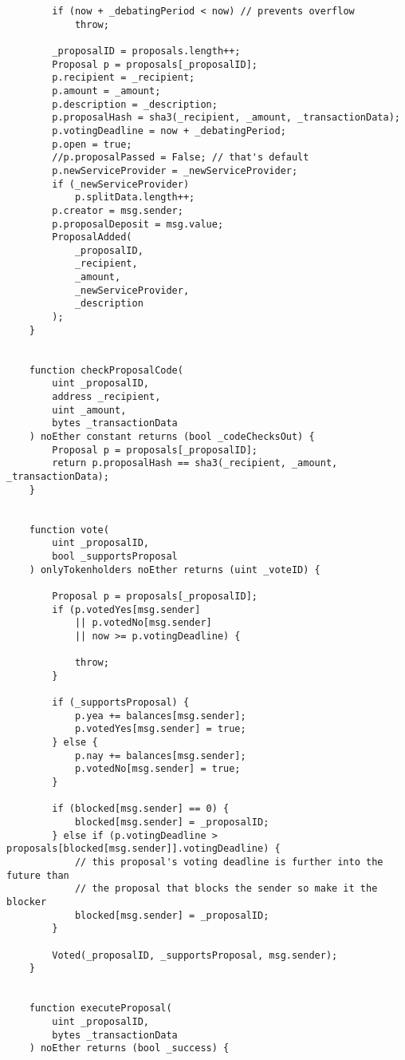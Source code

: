 \documentclass[9pt,oneside]{amsart}
\begin{document}
\begin{appendix}
\begin{verbatim}
        if (now + _debatingPeriod < now) // prevents overflow
            throw;

        _proposalID = proposals.length++;
        Proposal p = proposals[_proposalID];
        p.recipient = _recipient;
        p.amount = _amount;
        p.description = _description;
        p.proposalHash = sha3(_recipient, _amount, _transactionData);
        p.votingDeadline = now + _debatingPeriod;
        p.open = true;
        //p.proposalPassed = False; // that's default
        p.newServiceProvider = _newServiceProvider;
        if (_newServiceProvider)
            p.splitData.length++;
        p.creator = msg.sender;
        p.proposalDeposit = msg.value;
        ProposalAdded(
            _proposalID,
            _recipient,
            _amount,
            _newServiceProvider,
            _description
        );
    }


    function checkProposalCode(
        uint _proposalID,
        address _recipient,
        uint _amount,
        bytes _transactionData
    ) noEther constant returns (bool _codeChecksOut) {
        Proposal p = proposals[_proposalID];
        return p.proposalHash == sha3(_recipient, _amount, _transactionData);
    }


    function vote(
        uint _proposalID,
        bool _supportsProposal
    ) onlyTokenholders noEther returns (uint _voteID) {

        Proposal p = proposals[_proposalID];
        if (p.votedYes[msg.sender]
            || p.votedNo[msg.sender]
            || now >= p.votingDeadline) {

            throw;
        }

        if (_supportsProposal) {
            p.yea += balances[msg.sender];
            p.votedYes[msg.sender] = true;
        } else {
            p.nay += balances[msg.sender];
            p.votedNo[msg.sender] = true;
        }

        if (blocked[msg.sender] == 0) {
            blocked[msg.sender] = _proposalID;
        } else if (p.votingDeadline > proposals[blocked[msg.sender]].votingDeadline) {
            // this proposal's voting deadline is further into the future than
            // the proposal that blocks the sender so make it the blocker
            blocked[msg.sender] = _proposalID;
        }

        Voted(_proposalID, _supportsProposal, msg.sender);
    }


    function executeProposal(
        uint _proposalID,
        bytes _transactionData
    ) noEther returns (bool _success) {


\end{verbatim}
\end{appendix}
\end{document}
